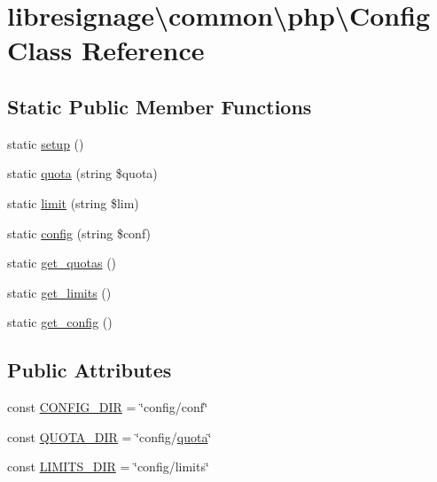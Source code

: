 \hypertarget{classlibresignage_1_1common_1_1php_1_1Config}{}\section{libresignage\textbackslash{}common\textbackslash{}php\textbackslash{}Config Class Reference}
\label{classlibresignage_1_1common_1_1php_1_1Config}
\subsection*{Static Public Member Functions}
\begin{DoxyCompactItemize}
\item 
static \hyperlink{classlibresignage_1_1common_1_1php_1_1Config_aeb3e3bc66dc3cefe907e2a14b28f863a}{setup} ()
\item 
static \hyperlink{classlibresignage_1_1common_1_1php_1_1Config_a59324fe7bd91e189c54c8a925df9359a}{quota} (string \$quota)
\item 
static \hyperlink{classlibresignage_1_1common_1_1php_1_1Config_aa5ca6f9b2b0220f309f024d6fc152058}{limit} (string \$lim)
\item 
static \hyperlink{classlibresignage_1_1common_1_1php_1_1Config_a435561f8ed294df80fab013aa869882d}{config} (string \$conf)
\item 
static \hyperlink{classlibresignage_1_1common_1_1php_1_1Config_a101acc4b49d4932e1161208917403f98}{get\+\_\+quotas} ()
\item 
static \hyperlink{classlibresignage_1_1common_1_1php_1_1Config_ac9ffddf3e09dc0e929ee50fee60199ce}{get\+\_\+limits} ()
\item 
static \hyperlink{classlibresignage_1_1common_1_1php_1_1Config_adc76cbc7153577a00953cb6eca556135}{get\+\_\+config} ()
\end{DoxyCompactItemize}
\subsection*{Public Attributes}
\begin{DoxyCompactItemize}
\item 
const \hyperlink{classlibresignage_1_1common_1_1php_1_1Config_ab089d5ebe7866ab317feb9d09c8f8642}{C\+O\+N\+F\+I\+G\+\_\+\+D\+IR} = \char`\"{}config/conf\char`\"{}
\item 
const \hyperlink{classlibresignage_1_1common_1_1php_1_1Config_a8345a7684928e0bd0676f5ad697e43dd}{Q\+U\+O\+T\+A\+\_\+\+D\+IR} = \char`\"{}config/\hyperlink{classlibresignage_1_1common_1_1php_1_1Config_a59324fe7bd91e189c54c8a925df9359a}{quota}\char`\"{}
\item 
const \hyperlink{classlibresignage_1_1common_1_1php_1_1Config_a4bd360498651c8a47ba7ad6044b75707}{L\+I\+M\+I\+T\+S\+\_\+\+D\+IR} = \char`\"{}config/limits\char`\"{}
\end{DoxyCompactItemize}
